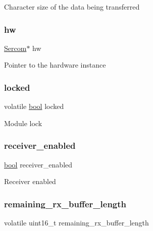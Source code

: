 Character size of the data being transferred \mbox{\label{structusart__module_a0c1e47f7408dce5f667a53398c82d13a}} 
\subsubsection{\texorpdfstring{hw}{hw}}
{\footnotesize\ttfamily \mbox{\hyperlink{union_sercom}{Sercom}}$\ast$ hw}

Pointer to the hardware instance \mbox{\label{structusart__module_a765892434f9329ded45a5287eeb75957}} 
\subsubsection{\texorpdfstring{locked}{locked}}
{\footnotesize\ttfamily volatile \mbox{\hyperlink{group__group__sam0__utils_ga97a80ca1602ebf2303258971a2c938e2}{bool}} locked}

Module lock \mbox{\label{structusart__module_aa555f88ee76a65a51c526b3e912b711d}} 
\subsubsection{\texorpdfstring{receiver\_enabled}{receiver\_enabled}}
{\footnotesize\ttfamily \mbox{\hyperlink{group__group__sam0__utils_ga97a80ca1602ebf2303258971a2c938e2}{bool}} receiver\+\_\+enabled}

Receiver enabled \mbox{\label{structusart__module_adbc4f86e8d157a19a354c981e1486865}} 
\subsubsection{\texorpdfstring{remaining\_rx\_buffer\_length}{remaining\_rx\_buffer\_length}}
{\footnotesize\ttfamily volatile uint16\+\_\+t remaining\+\_\+rx\+\_\+buffer\+\_\+length}

